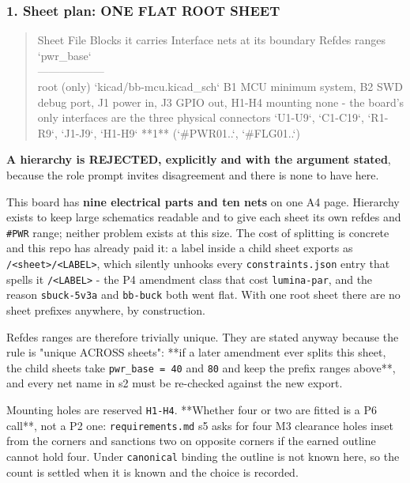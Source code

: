 \documentclass[11pt,a4paper]{article}
\begin{document}
\subsubsection*{1. Sheet plan: ONE FLAT ROOT SHEET}
\begin{quote}\small\ttfamily\raggedright
\textbar{} Sheet \textbar{} File \textbar{} Blocks it carries \textbar{} Interface nets at its boundary \textbar{} Refdes ranges \textbar{} `pwr\_base` \textbar{}\\
\textbar{}---\textbar{}---\textbar{}---\textbar{}---\textbar{}---\textbar{}---\textbar{}\\
\textbar{} root (only) \textbar{} `kicad/bb-mcu.kicad\_sch` \textbar{} B1 MCU minimum system, B2 SWD debug port, J1 power in, J3 GPIO out, H1-H4 mounting \textbar{} none - the board's only interfaces are the three physical connectors \textbar{} `U1-U9`, `C1-C19`, `R1-R9`, `J1-J9`, `H1-H9` \textbar{} {*}{*}1{*}{*} (`\#PWR01..`, `\#FLG01..`) \textbar{}
\end{quote}
\textbf{A hierarchy is REJECTED, explicitly and with the argument stated}, because the role prompt invites disagreement and there is none to have here.

This board has \textbf{nine electrical parts and ten nets} on one A4 page. Hierarchy exists to keep large schematics readable and to give each sheet its own refdes and \texttt{\#PWR} range; neither problem exists at this size. The cost of splitting is concrete and this repo has already paid it: a label inside a child sheet exports as \texttt{/\textless{}sheet\textgreater{}/\textless{}LABEL\textgreater{}}, which silently unhooks every \texttt{constraints.json} entry that spells it \texttt{/\textless{}LABEL\textgreater{}} - the P4 amendment class that cost \texttt{lumina-par}, and the reason \texttt{sbuck-5v3a} and \texttt{bb-buck} both went flat. With one root sheet there are no sheet prefixes anywhere, by construction.

Refdes ranges are therefore trivially unique. They are stated anyway because the rule is "unique ACROSS sheets": {*}{*}if a later amendment ever splits this sheet, the child sheets take \texttt{pwr\_base = 40} and \texttt{80} and keep the prefix ranges above{*}{*}, and every net name in s2 must be re-checked against the new export.

Mounting holes are reserved \texttt{H1-H4}. {*}{*}Whether four or two are fitted is a P6 call{*}{*}, not a P2 one: \texttt{requirements.md} s5 asks for four M3 clearance holes inset from the corners and sanctions two on opposite corners if the earned outline cannot hold four. Under \texttt{canonical} binding the outline is not known here, so the count is settled when it is known and the choice is recorded.
\end{document}
